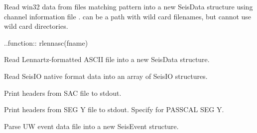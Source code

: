 \documentclass[letterpaper,11pt,english]{sphinxmanual}
\begin{document}
Read win32 data from files matching pattern  into a new SeisData structure using channel information file .  can be a path with wild card filenames, but cannot use wild card directories.

..function:: rlennasc(fname)

Read Lennartz-formatted ASCII file into a new SeisData structure.

\begin{fulllineitems}
\label{\detokenize{src/Formats/fileformats:rseis}}
\end{fulllineitems}


Read SeisIO native format data into an array of SeisIO structures.

\begin{fulllineitems}
\label{\detokenize{src/Formats/fileformats:sachdr}}
\end{fulllineitems}


Print headers from SAC file to stdout.

\begin{fulllineitems}
\label{\detokenize{src/Formats/fileformats:segyhdr}}
\end{fulllineitems}


Print headers from SEG Y file to stdout. Specify  for PASSCAL SEG Y.

\begin{fulllineitems}
\label{\detokenize{src/Formats/fileformats:uwdf}}
\end{fulllineitems}


Parse UW event data file  into a new SeisEvent structure.


\begin{fulllineitems}
\end{fulllineitems}
\end{document}

